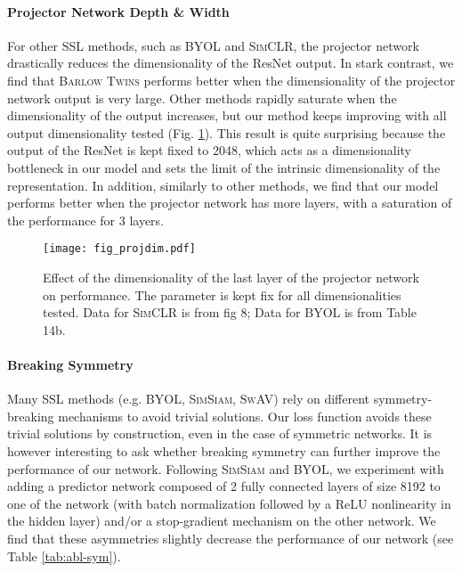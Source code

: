 \documentclass{article}
\newcommand{\AlgoName}{\textsc{Barlow Twins}}
\begin{document}
\paragraph{Projector Network Depth \& Width} For other SSL methods, such as \textsc{BYOL} and \textsc{SimCLR}, the projector network drastically reduces the dimensionality of the ResNet output. In stark contrast, we find that \AlgoName{} performs better when the dimensionality of the projector network output is very large. Other methods rapidly saturate when the dimensionality of the output increases, but our method keeps improving with all output dimensionality tested (Fig. \ref{fig:fig_projdim}). This result is quite surprising because the output of the ResNet is kept fixed to 2048, which acts as a dimensionality bottleneck in our model and sets the limit of the intrinsic dimensionality of the representation. In addition, similarly to other methods, we find that our model performs better when the projector network has more layers, with a saturation of the performance for 3 layers.

\begin{figure}[h!]
\vskip 0.2in
\begin{center}
\centerline{\texttt{[image: fig\_projdim.pdf]}}
\caption{Effect of the dimensionality of the last layer of the projector network on performance. The parameter  is kept fix for all dimensionalities tested. Data for \textsc{SimCLR} is from \cite{chen2020simple} fig 8; Data for \textsc{BYOL} is from \cite{grill2020bootstrap} Table 14b.}
\label{fig:fig_projdim}
\end{center}
\vskip -0.2in
\end{figure}















\paragraph{Breaking Symmetry} Many SSL methods (e.g. \textsc{BYOL}, \textsc{SimSiam}, \textsc{SwAV}) rely on different symmetry-breaking mechanisms to avoid trivial solutions. Our loss function avoids these trivial solutions by construction, even in the case of symmetric networks. It is however interesting to ask whether breaking symmetry can further improve the performance of our network. Following \textsc{SimSiam} and \textsc{BYOL}, we experiment with adding a predictor network composed of 2 fully connected layers of size 8192 to one of the network (with batch normalization followed by a ReLU nonlinearity in the hidden layer) and/or a stop-gradient mechanism on the other network. We find that these asymmetries slightly decrease the performance of our network (see Table \ref{tab:abl-sym}). 
\end{document}
